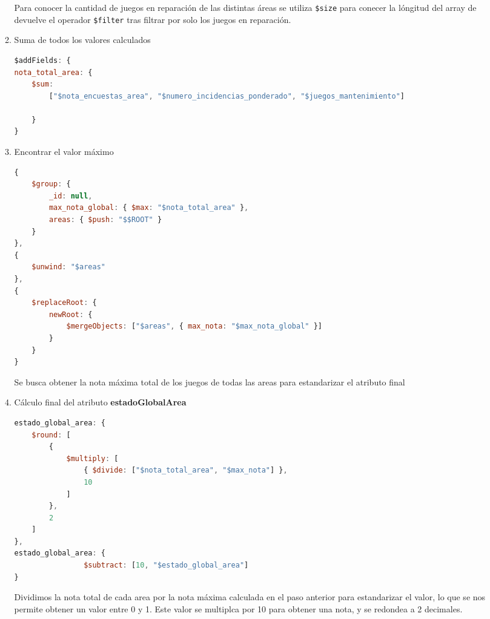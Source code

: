 \documentclass[]{article}
\begin{document}
\begin{itemize}
\begin{enumerate}
        Para conocer la cantidad de juegos en reparación de las distintas áreas
        se utiliza \texttt{\$size} para conecer la lóngitud del array de
        devuelve el operador \texttt{\$filter} tras filtrar por solo los juegos en reparación.

        \item Suma de todos los valores calculados
        
        \begin{lstlisting}[language=JavaScript, caption=Calculo de not\_total\_area]
$addFields: {
nota_total_area: {
    $sum: 
        ["$nota_encuestas_area", "$numero_incidencias_ponderado", "$juegos_mantenimiento"]
    
    }
}
        \end{lstlisting}

        \item Encontrar el valor máximo
        
        \begin{lstlisting}[language=JavaScript, caption=Agrupación de áreas previa a la normalización]
{
    $group: {
        _id: null,
        max_nota_global: { $max: "$nota_total_area" },
        areas: { $push: "$$ROOT" }
    }
},
{
    $unwind: "$areas"
},
{
    $replaceRoot: {
        newRoot: {
            $mergeObjects: ["$areas", { max_nota: "$max_nota_global" }]
        }
    }
}
        \end{lstlisting}

        Se busca obtener la nota máxima total de los juegos de todas las areas para estandarizar el atributo final
    
        \item Cálculo final del atributo \textbf{estadoGlobalArea}
        
        \begin{lstlisting}[language=JavaScript, caption=Cálculo de estado\_global\_area]
estado_global_area: {
    $round: [
        {
            $multiply: [
                { $divide: ["$nota_total_area", "$max_nota"] },
                10
            ]
        },
        2
    ]
},
estado_global_area: {
                $subtract: [10, "$estado_global_area"]
}
        \end{lstlisting}

        Dividimos la nota total de cada area por la nota máxima calculada en el paso anterior para estandarizar el valor, lo que se nos permite obtener un valor entre 0 y 1. Este valor se multiplca por 10 para obtener una nota, y se redondea a 2 decimales.


\end{enumerate}
\end{itemize}
\end{document}

